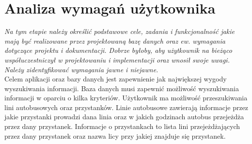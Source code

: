 \section{Analiza wymagań użytkownika}

\textit{Na tym etapie należy określić podstawowe
cele, zadania i funkcjonalność jakie mają być realizowane przez projektowaną bazę danych
oraz ew. wymagania dotyczące projektu i dokumentacji. Dobrze byłoby, aby użytkownik
na bieżąco współuczestniczył w projektowaniu i implementacji oraz wnosił swoje uwagi.
Należy zidentyfikować wymagania jawne i niejawne.} \\

Celem aplikacji oraz bazy danych jest zapewnienie jak największej wygody wyszukiwania informacji. Baza danych musi zapewnić możliwość wyszukiwania informacji w oparciu o kilka kryteriów. Użytkownik ma możliwość przeszukiwania lini autobusowych oraz przystanków. Linie autobusowe zawierają informacje przez jakie przystanki prowadzi dana linia oraz w jakich godzinach autobus przejeżdża przez dany przystanek. Informacje o przystankach to lista lini przejeżdżających przez dany przystanek oraz nazwa licy przy jakiej znajduje się przystanek.